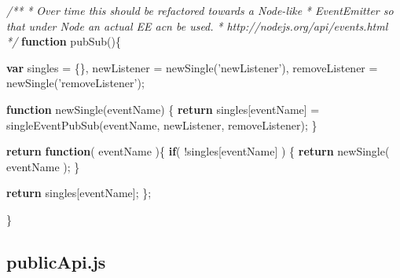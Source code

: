 \documentclass[12pt, ]{article}
\newenvironment{Shaded}{}{}
\newcommand{\KeywordTok}[1]{\textcolor[rgb]{0.00,0.44,0.13}{\textbf{{#1}}}}
\newcommand{\StringTok}[1]{\textcolor[rgb]{0.25,0.44,0.63}{{#1}}}
\newcommand{\CommentTok}[1]{\textcolor[rgb]{0.38,0.63,0.69}{\textit{{#1}}}}
\newcommand{\FunctionTok}[1]{\textcolor[rgb]{0.02,0.16,0.49}{{#1}}}
\newcommand{\NormalTok}[1]{{#1}}
\begin{document}
\begin{Shaded}
\begin{Highlighting}[]
\CommentTok{/** }
\CommentTok{ * Over time this should be refactored towards a Node-like}
\CommentTok{ *    EventEmitter so that under Node an actual EE acn be used.}
\CommentTok{ *    http://nodejs.org/api/events.html}
\CommentTok{ */}
\KeywordTok{function} \FunctionTok{pubSub}\NormalTok{()\{}

   \KeywordTok{var} \NormalTok{singles = \{\},}
       \NormalTok{newListener = }\FunctionTok{newSingle}\NormalTok{(}\StringTok{'newListener'}\NormalTok{),}
       \NormalTok{removeListener = }\FunctionTok{newSingle}\NormalTok{(}\StringTok{'removeListener'}\NormalTok{); }
      
   \KeywordTok{function} \FunctionTok{newSingle}\NormalTok{(eventName) \{}
      \KeywordTok{return} \NormalTok{singles[eventName] = }\FunctionTok{singleEventPubSub}\NormalTok{(eventName, newListener, removeListener);   }
   \NormalTok{\}      }

   \KeywordTok{return} \KeywordTok{function}\NormalTok{( eventName )\{   }
      \KeywordTok{if}\NormalTok{( !singles[eventName] ) \{}
         \KeywordTok{return} \FunctionTok{newSingle}\NormalTok{( eventName );}
      \NormalTok{\}}
      
      \KeywordTok{return} \NormalTok{singles[eventName];   }
   \NormalTok{\};}
   
\NormalTok{\}}
\end{Highlighting}
\end{Shaded}

\pagebreak

\subsection{publicApi.js}\label{headerux5fpublicApi}

\label{src_publicApi}
\end{document}
